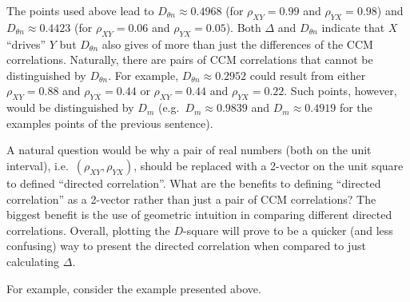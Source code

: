 \documentclass[a4paper,11pt]{article}
\begin{document}
The points used above lead to $D_{\theta n} \approx 0.4968$ (for $\rho_{XY} = 0.99$ and $\rho_{YX} = 0.98$) and $D_{\theta n} \approx 0.4423$ (for $\rho_{XY} = 0.06$ and $\rho_{YX} = 0.05$).  Both $\Delta$ and $D_{\theta n}$ indicate that $X$ ``drives'' $Y$ but $D_{\theta n}$ also gives of more than just the differences of the CCM correlations.  Naturally, there are pairs of CCM correlations that cannot be distinguished by $D_{\theta n}$.  For example, $D_{\theta n} \approx 0.2952$ could result from either $\rho_{XY} = 0.88$ and $\rho_{YX} = 0.44$ or $\rho_{XY} = 0.44$ and $\rho_{YX} = 0.22$.  Such points, however, would be distinguished by $D_m$ (e.g.\ $D_m \approx 0.9839$ and $D_m \approx 0.4919$ for the examples points of the previous sentence).

A natural question would be why a pair of real numbers (both on the unit interval), i.e.\ $\left(\rho_{XY},\rho_{YX}\right)$, should be replaced with a 2-vector on the unit square to defined ``directed correlation''.  What are the benefits to defining ``directed correlation'' as a 2-vector rather than just a pair of CCM correlations?  The biggest benefit is the use of geometric intuition in comparing different directed correlations.  Overall, plotting the $D$-square will prove to be a quicker (and less confusing) way to present the directed correlation when compared to just calculating $\Delta$.

For example, consider the example presented above.  
\end{document}
